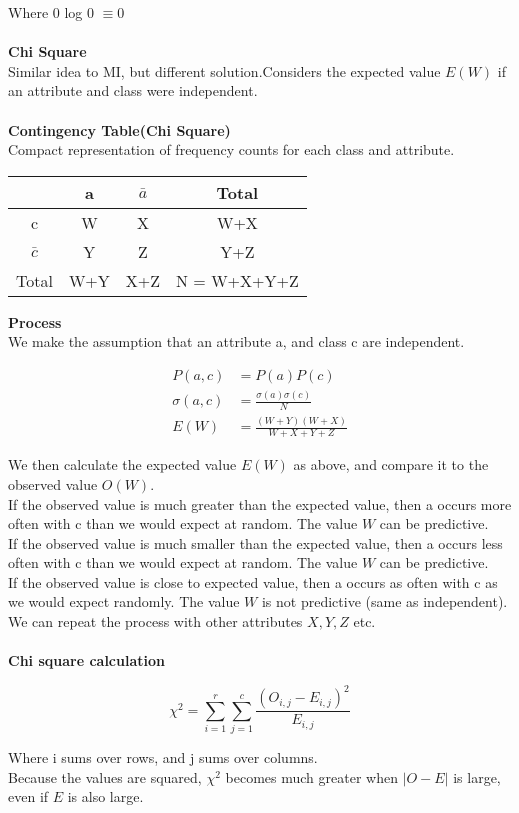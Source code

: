 \documentclass[a4paper,10pt]{article}
\begin{document}
\noindent Where 0 log 0 $\equiv 0$ \\\\
\newpage
\noindent \textcolor{Periwinkle}{\textbf{Chi Square}}\\
Similar idea to MI, but different solution.Considers the expected value $E(W)$ if an attribute and class were independent. \\\\
\textcolor{Periwinkle}{\textbf{Contingency Table(Chi Square)}}\\
Compact representation of frequency counts for each class and attribute. 
\begin{center}
	\begin{tabular}{|c|c|c|c|}
		\hline
		&a &$\bar{a}$ &Total \\
		\hline 
		c &W &X &W+X \\
		$\bar{c}$ &Y &Z &Y+Z \\
		\hline 
		Total &W+Y &X+Z &N = W+X+Y+Z \\
		\hline
	\end{tabular}
\end{center}
\textcolor{Periwinkle}{\textbf{Process}}\\
We make the assumption that an attribute a, and class c are independent. 
\begin{shaded}
	\begin{align*}
		P(a,c) &= P(a)P(c) \\
		\sigma(a,c) &= \frac{\sigma(a)\sigma(c)}{N} \\
		E(W) &= \frac{(W+Y)(W+X)}{W+X+Y+Z}
	\end{align*}
\end{shaded}
\noindent We then calculate the expected value $E(W)$ as above, and compare it to the observed value $O(W)$. \\
If the observed value is much greater than the expected value, then a occurs more often with c than we would expect at random. The value $W$ can be predictive. \\
If the observed value is much smaller than the expected value, then a occurs less often with c than we would expect at random. The value $W$ can be predictive. \\
If the observed value is close to expected value, then a occurs as often with c as we would expect randomly. The value $W$ is not predictive (same as independent).\\
We can repeat the process with other attributes $X,Y,Z$ etc. \\\\
\textcolor{Periwinkle}{\textbf{Chi square calculation}}
\begin{shaded}
	\begin{equation*}
		\chi^{2} = \sum_{i=1}^{r}\sum_{j=1}^{c}\frac{(O_{i,j} - E_{i,j})^{2}}{E_{i,j}}
	\end{equation*}
\end{shaded}
\noindent Where i sums over rows, and j sums over columns. \\
Because the values are squared, $\chi^{2}$ becomes much greater when $|O-E|$ is large, even if $E$ is also large. 
\end{document}
